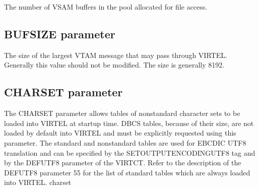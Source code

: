 \documentclass[letterpaper,10pt,english]{sphinxmanual}
\begin{document}
\sphinxAtStartPar
{} \sphinxhyphen{} The number of VSAM buffers in the pool allocated for file access.

\ignorespaces 

\subsection{BUFSIZE parameter}
\label{\detokenize{Installation_Guide:bufsize-parameter}}\label{\detokenize{Installation_Guide:index-42}}
\begin{sphinxVerbatim}[commandchars=\\\{\}]
 
\end{sphinxVerbatim}

\sphinxAtStartPar
{} \sphinxhyphen{} The size of the largest VTAM message that may pass through VIRTEL. Generally this value should not be modified. The size is generally 8192.

\ignorespaces 

\subsection{CHARSET parameter}
\label{\detokenize{Installation_Guide:charset-parameter}}\label{\detokenize{Installation_Guide:index-43}}
\begin{sphinxVerbatim}[commandchars=\\\{\}]
 
\end{sphinxVerbatim}

\sphinxAtStartPar
The CHARSET parameter allows tables of non\sphinxhyphen{}standard character sets to be loaded into VIRTEL at startup time. DBCS tables, because of their size, are not loaded by default into VIRTEL and must be explicitly requested using this parameter. The standard and non\sphinxhyphen{}standard tables are used for EBCDIC \sphinxhyphen{} UTF\sphinxhyphen{}8 translation and can be specified by the SET\sphinxhyphen{}OUTPUT\sphinxhyphen{}ENCODING\sphinxhyphen{}UTF\sphinxhyphen{}8 tag and by the DEFUTF8 parameter of the VIRTCT. Refer to the description of the DEFUTF8 parameter 55 for the list of standard tables which are always loaded into VIRTEL.
charset
\end{document}
